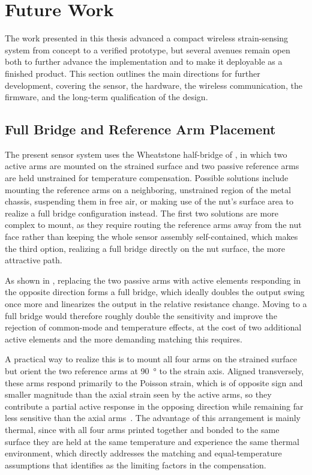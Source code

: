 \section{Future Work}
The work presented in this thesis advanced a compact wireless strain-sensing system from concept to a verified prototype, but several avenues remain open both to further advance the implementation and to make it deployable as a finished product. 
This section outlines the main directions for further development, covering the sensor, the hardware, the wireless communication, the firmware, and the long-term qualification of the design.
 
\subsection{Full Bridge and Reference Arm Placement}
The present sensor system uses the Wheatstone half-bridge of , in which two active arms are mounted on the strained surface and two passive reference arms are held unstrained for temperature compensation. Possible solutions include mounting the reference arms on a neighboring, unstrained region of the metal chassis, suspending them in free air, or making use of the nut's surface area to realize a full bridge configuration instead. The first two solutions are more complex to mount, as they require routing the reference arms away from the nut face rather than keeping the whole sensor assembly self-contained, which makes the third option, realizing a full bridge directly on the nut surface, the more attractive path.

As shown in , replacing the two passive arms with active elements responding in the opposite direction forms a full bridge, which ideally doubles the output swing once more and linearizes the output in the relative resistance change. Moving to a full bridge would therefore roughly double the sensitivity and improve the rejection of common-mode and temperature effects, at the cost of two additional active elements and the more demanding matching this requires.

A practical way to realize this is to mount all four arms on the strained surface but orient the two reference arms at \SI{90}{\degree} to the strain axis. Aligned transversely, these arms respond primarily to the Poisson strain, which is of opposite sign and smaller magnitude than the axial strain seen by the active arms, so they contribute a partial active response in the opposing direction while remaining far less sensitive than the axial arms~\cite{hbm_wheatstone_bridge}. The advantage of this arrangement is mainly thermal, since with all four arms printed together and bonded to the same surface they are held at the same temperature and experience the same thermal environment, which directly addresses the matching and equal-temperature assumptions that  identifies as the limiting factors in the compensation.

